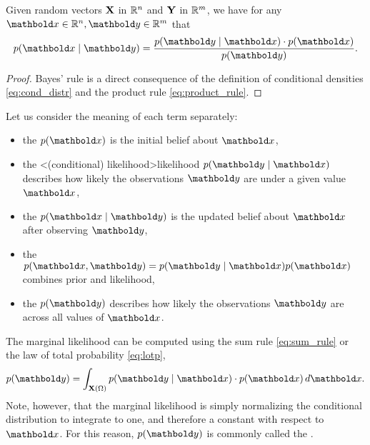 \begin{thmb}
  \begin{thm}
    Given random vectors $\mathbf{X}$ in $\mathbb{R}^n$ and $\mathbf{Y}$ in $\mathbb{R}^m$, we have for any $\vx \in \R^n, \vy \in \R^m$ that
    \begin{align}
      p(\vx \mid \vy) = \frac{p(\vy \mid \vx) \cdot p(\vx)}{p(\vy)}. \label{eq:bayes_rule}
    \end{align}
  \end{thm}
\end{thmb}
\begin{proof}
  Bayes' rule is a direct consequence of the definition of conditional densities \eqref{eq:cond_distr} and the product rule \eqref{eq:product_rule}.
\end{proof}

Let us consider the meaning of each term separately: \begin{itemize}
  \item the  $p(\vx)$ is the initial belief about $\vx$,
  \item the \midx<(conditional) likelihood>{likelihood} $p(\vy \mid \vx)$ describes how likely the observations $\vy$ are under a given value $\vx$,
  \item the  $p(\vx \mid \vy)$ is the updated belief about $\vx$ after observing $\vy$,
  \item the  $p(\vx, \vy) = p(\vy \mid \vx) p(\vx)$ combines prior and likelihood,
  \item the  $p(\vy)$ describes how likely the observations $\vy$ are across all values of $\vx$.
\end{itemize}
The marginal likelihood can be computed using the sum rule \eqref{eq:sum_rule} or the law of total probability \eqref{eq:lotp}, \begin{align}
  p(\vy) = \int_{\rX(\Omega)} p(\vy \mid \vx) \cdot p(\vx) \,d\vx. \label{eq:marginal_likelihood}
\end{align}
Note, however, that the marginal likelihood is simply normalizing the conditional distribution to integrate to one, and therefore a constant with respect to $\vx$.
For this reason, $p(\vy)$ is commonly called the .

